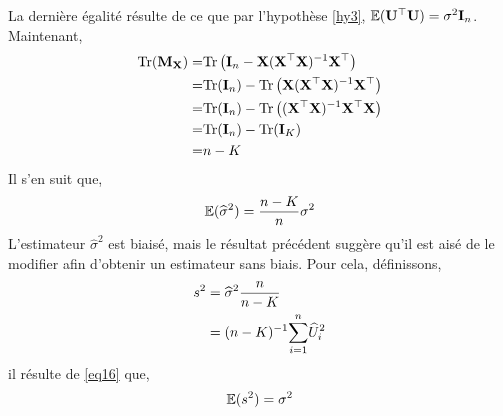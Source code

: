 La dernière égalité résulte de ce que par l'hypothèse \ref{hy3}, $\mathbb{E}(\mathbf{U}^\top\mathbf{U}) = \sigma^2\mathbf{I}_n$. Maintenant,
\begin{align*}
\mathrm{Tr}(\mathbf{M}_\mathbf{X}) = &\mathrm{Tr}\left(\mathbf{I}_n - \mathbf{X}(\mathbf{X}^\top\mathbf{X})^{-1}\mathbf{X}^\top\right)\\
=&\mathrm{Tr}(\mathbf{I}_n) - \mathrm{Tr}\left(
\mathbf{X}(\mathbf{X}^\top\mathbf{X})^{-1}\mathbf{X}^\top\right)\\
=&\mathrm{Tr}(\mathbf{I}_n) - \mathrm{Tr}\left((\mathbf{X}^\top\mathbf{X})^{-1}\mathbf{X}^\top\mathbf{X}\right)\\
=&\mathrm{Tr}(\mathbf{I}_n) - \mathrm{Tr}(\mathbf{I}_K)\\
=&n-K
\end{align*}
Il s'en suit que,
\begin{align}
\mathbb{E}(\widehat{\sigma}^2) = \frac{n-K}{n}\sigma^2
\label{eq16}
\end{align}
L'estimateur $\widehat{\sigma}^2$ est biaisé, mais le résultat précédent suggère qu'il est aisé de le modifier afin d'obtenir un estimateur sans biais. Pour cela, définissons,
\begin{align*}
s^2 &= \widehat{\sigma}^2\frac{n}{n-K}\\
&=(n-K)^{-1}\underset{i=1}{\overset{n}{\sum}} \widehat{U}_i^2
\end{align*}
il résulte de \eqref{eq16} que, 
\begin{align*}
\mathbb{E}(s^2) = \sigma^2
\end{align*}

